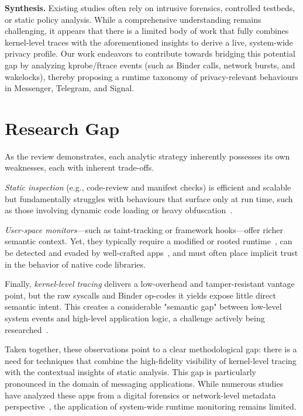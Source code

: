 \documentclass[a4paper,12pt]{report}
\begin{document}
\medskip
\noindent\textbf{Synthesis.}
Existing studies often rely on intrusive forensics, controlled testbeds, or static policy analysis. While a comprehensive understanding remains challenging, it appears that there is a limited body of work that fully combines kernel-level traces with the aforementioned insights to derive a live, system-wide privacy profile. Our work endeavors to contribute towards bridging this potential gap by analyzing kprobe/ftrace events (such as Binder calls, network bursts, and wakelocks), thereby proposing a runtime taxonomy of privacy-relevant behaviours in Messenger, Telegram, and Signal.
\section{Research Gap}
\label{sec:rw:gap}

As the review demonstrates, each analytic strategy inherently possesses its own weaknesses, each with inherent trade-offs.

\emph{Static inspection} (e.g., code-review and manifest checks) is efficient and scalable but fundamentally struggles with behaviours that surface only at run time, such as those involving dynamic code loading or heavy obfuscation~\cite{li2016droidra, feng2020survey}.

\emph{User-space monitors}—such as taint-tracking or framework hooks—offer richer semantic context. Yet, they typically require a modified or rooted runtime~\cite{xposed, enck2014taintdroid}, can be detected and evaded by well-crafted apps~\cite{inviseal2023}, and must often place implicit trust in the behavior of native code libraries.

Finally, \emph{kernel-level tracing} delivers a low-overhead and tamper-resistant vantage point, but the raw syscalls and Binder op-codes it yields expose little direct semantic intent. This creates a considerable "semantic gap" between low-level system events and high-level application logic, a challenge actively being researched~\cite{nisi2019syscall}.

Taken together, these observations point to a clear methodological gap: there is a need for techniques that combine the high-fidelity visibility of kernel-level tracing with the contextual insights of static analysis. This gap is particularly pronounced in the domain of messaging applications. While numerous studies have analyzed these apps from a digital forensics or network-level metadata perspective~\cite{arxiv2020metadata}, the application of system-wide runtime monitoring remains limited.
\end{document}
